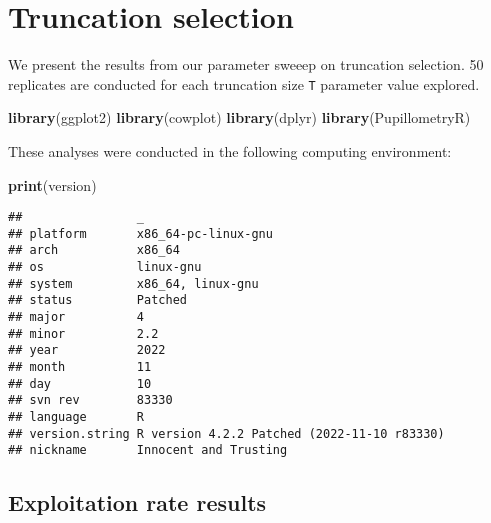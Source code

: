 \documentclass[]{book}
\newenvironment{Shaded}{\begin{snugshade}}{\end{snugshade}}
\newcommand{\KeywordTok}[1]{\textcolor[rgb]{0.13,0.29,0.53}{\textbf{#1}}}
\newcommand{\NormalTok}[1]{#1}
\begin{document}
\hypertarget{truncation-selection}{%
\chapter{Truncation selection}\label{truncation-selection}}

We present the results from our parameter sweeep on truncation selection.
50 replicates are conducted for each truncation size \texttt{T} parameter value explored.

\begin{Shaded}
\begin{Highlighting}[]
\KeywordTok{library}\NormalTok{(ggplot2)}
\KeywordTok{library}\NormalTok{(cowplot)}
\KeywordTok{library}\NormalTok{(dplyr)}
\KeywordTok{library}\NormalTok{(PupillometryR)}
\end{Highlighting}
\end{Shaded}

These analyses were conducted in the following computing environment:

\begin{Shaded}
\begin{Highlighting}[]
\KeywordTok{print}\NormalTok{(version)}
\end{Highlighting}
\end{Shaded}

\begin{verbatim}
##                _                                          
## platform       x86_64-pc-linux-gnu                        
## arch           x86_64                                     
## os             linux-gnu                                  
## system         x86_64, linux-gnu                          
## status         Patched                                    
## major          4                                          
## minor          2.2                                        
## year           2022                                       
## month          11                                         
## day            10                                         
## svn rev        83330                                      
## language       R                                          
## version.string R version 4.2.2 Patched (2022-11-10 r83330)
## nickname       Innocent and Trusting
\end{verbatim}

\hypertarget{exploitation-rate-results-1}{%
\section{Exploitation rate results}\label{exploitation-rate-results-1}}
\end{document}
